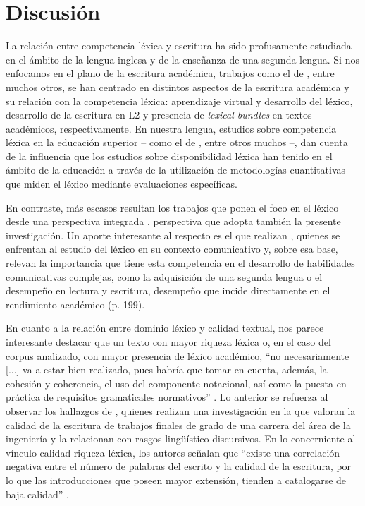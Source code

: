 \documentclass{textolivre}
\begin{document}
\section{Discusión}\label{sec-discusion}
La relación entre competencia léxica y escritura ha sido profusamente estudiada
en el ámbito de la lengua inglesa y de la enseñanza de una segunda lengua. Si
nos enfocamos en el plano de la escritura académica, trabajos como el de \textcite{PrezCaado2010,Yoon2018,Pan2019}, 
entre muchos otros, se han centrado en
distintos aspectos de la escritura académica y su relación con la competencia
léxica: aprendizaje virtual y desarrollo del léxico, desarrollo de la escritura
en L2 y presencia de \textit{lexical bundles} en textos académicos, respectivamente. En
nuestra lengua, estudios sobre competencia léxica en la educación superior –
como el de \textcite{RiffoOcares2014,munoz2015,GonzaloZapico2016,Zapico2017,vega2018,Trigo2019},
entre otros muchos –, dan cuenta de la influencia que los estudios sobre
disponibilidad léxica han tenido en el ámbito de la educación a través de
la utilización de metodologías cuantitativas que miden el léxico mediante
evaluaciones específicas.

En contraste, más escasos resultan los trabajos que ponen el foco en el
léxico desde una perspectiva integrada \cite[p. e.]{madrigal2016,gracia2019},
perspectiva que adopta también la presente investigación. Un aporte
interesante al respecto es el que realizan \textcite{aravena}, quienes se
enfrentan al estudio del léxico en su contexto comunicativo y, sobre esa base,
relevan la importancia que tiene esta competencia en el desarrollo de
habilidades comunicativas complejas, como la adquisición de una segunda lengua
o el desempeño en lectura y escritura, desempeño que incide directamente en el
rendimiento académico (p. 199). 

En cuanto a la relación entre dominio léxico y calidad textual, nos
parece interesante destacar que un texto con mayor riqueza léxica o, en el caso
del corpus analizado, con mayor presencia de léxico académico, “no
necesariamente [...] va a estar bien realizado, pues habría que tomar en cuenta,
además, la cohesión y coherencia, el uso del componente notacional, así como la
puesta en práctica de requisitos gramaticales normativos” \cite[p. 145]{madrigal2016}.
Lo anterior se refuerza al observar los hallazgos de
\textcite{LilloFuentes2020}, quienes realizan una investigación en la
que valoran la calidad de la escritura de trabajos finales de grado de una
carrera del área de la ingeniería y la relacionan con rasgos
lingüístico-discursivos. En lo concerniente al vínculo calidad-riqueza léxica,
los autores señalan que “existe una correlación negativa entre el número de
palabras del escrito y la calidad de la escritura, por lo que las
introducciones que poseen mayor extensión, tienden a catalogarse de baja
calidad” \cite[p. 11]{LilloFuentes2020}.
\end{document}
